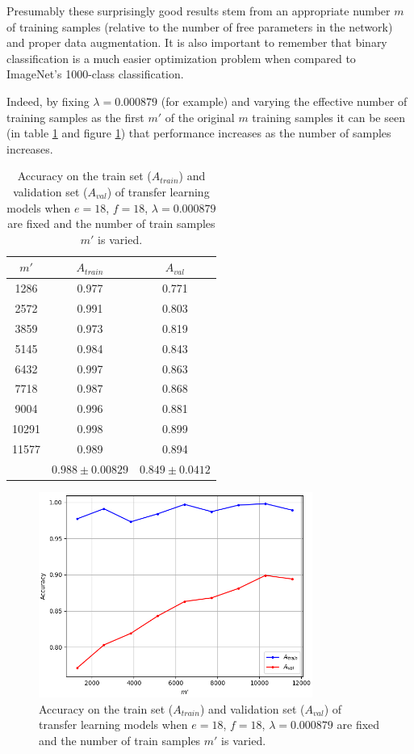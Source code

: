 Presumably these surprisingly good results stem from an appropriate number $m$ of training samples (relative to the number of free parameters in the network) and proper data augmentation. It is also important to remember that binary classification is a much easier optimization problem when compared to ImageNet's 1000-class classification.

Indeed, by fixing $\lambda = 0.000879$ (for example) and varying the effective number of training samples as the first $m'$ of the original $m$ training samples it can be seen (in table \ref{table:vgg16_total_debug} and figure \ref{fig:vgg16_total_debug}) that performance increases as the number of samples increases.

\begin{table}[ht]
\centering
\begin{tabular}{ |c|c|c| }
\hline
$m'$ & $A_{train}$ & $A_{val}$ \\
\hline
1286 & 0.977 & 0.771  \\
2572 & 0.991 & 0.803  \\
3859 & 0.973 & 0.819  \\
5145 & 0.984 & 0.843  \\
6432 & 0.997 & 0.863  \\
7718 & 0.987 & 0.868  \\
9004 & 0.996 & 0.881  \\
10291 & 0.998 & 0.899 \\
11577 & 0.989 & 0.894 \\
\hline
 & $0.988\pm0.00829$ & $0.849\pm0.0412$ \\
\hline
\end{tabular}
\caption{Accuracy on the train set ($A_{train}$) and validation set ($A_{val}$) of transfer learning models when $e = 18$, $f = 18$, $\lambda = 0.000879$ are fixed and the number of train samples $m'$ is varied.}
\label{table:vgg16_total_debug}
\end{table}

\begin{figure}[ht]
    \centering
    \includegraphics[width=0.8\textwidth]{figs/vgg16_total_debug.png}
    \caption{Accuracy on the train set ($A_{train}$) and validation set ($A_{val}$) of transfer learning models when $e = 18$, $f = 18$, $\lambda = 0.000879$ are fixed and the number of train samples $m'$ is varied.}
    \label{fig:vgg16_total_debug}
\end{figure}

